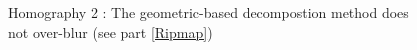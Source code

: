 
\begin{figure}
\caption{Homography 2 : The geometric-based decompostion method does not over-blur (see part \ref{Ripmap})}
\label{Homo2}
\end{figure}




